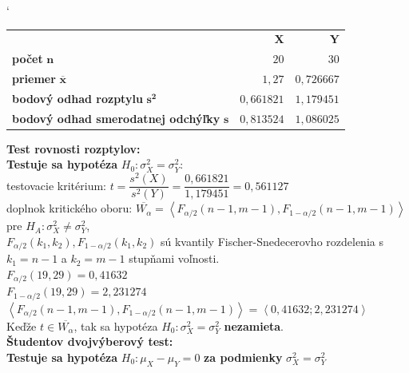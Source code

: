 \documentclass[pdftex, 11pt, a4paper, titlepage]{article}
\begin{document}
    \begin{table}[H]
        \catcode`
        \begin{tabular}{l|r|r|}
            \cline{2-3}
            & $ \boldsymbol{X} $ & $ \boldsymbol{Y} $ \\
            \cline{2-3}
			\textbf{počet} $ \boldsymbol{n} $ & $ 20 $ & $ 30 $ \\
			\textbf{priemer} $ \boldsymbol{\overline{x}} $ & $ 1,27 $
			& $ 0,726667 $ \\

			\textbf{bodový odhad rozptylu} $ \boldsymbol{s^2} $ & $ 0,661821 $
			& $ 1,179451 $ \\

			\textbf{bodový odhad smerodatnej odchýľky} $ \boldsymbol{s} $ & $ 0,813524 $
            & $ 1,086025 $ \\
            \cline{2-3}
		\end{tabular}
    \end{table}

    \newpage
    \noindent
    \textbf{Test rovnosti rozptylov:}\\
    \textbf{Testuje sa hypotéza} $H_0 : \sigma_X^2 = \sigma_Y^2$:\\

    \noindent
    testovacie kritérium: $t = \dfrac{s^2(X)}{s^2(Y)} = \dfrac{0,661821}{1,179451} = 0,561127$\\
    doplnok kritického oboru: $\overline{W_\alpha} = \left\langle F_{\alpha/2}(n-1,m-1), F_{1-\alpha/2}(n-1,m-1) \right\rangle$ pre $H_A : \sigma_X^2 \neq \sigma_Y^2$,\\
    $F_{\alpha/2}(k_1,k_2), F_{1-\alpha/2}(k_1,k_2)$ sú kvantily Fischer-Snedecerovho rozdelenia s $k_1 = n-1$ a $k_2 = m-1$ stupňami voľnosti.\\
    $F_{\alpha/2}(19,29) = 0,41632$\\
    $F_{1-\alpha/2}(19,29) = 2,231274$\\
    $\left\langle F_{\alpha/2}(n-1,m-1), F_{1-\alpha/2}(n-1,m-1) \right\rangle = \left\langle 0,41632 ; 2,231274 \right\rangle$\\
    Keďže $t \in \overline{W_\alpha}$, tak sa hypotéza $H_0 : \sigma_X^2 = \sigma_Y^2$ \textbf{nezamieta}.\\

    \noindent
    \textbf{Študentov dvojvýberový test:}\\
    \textbf{Testuje sa hypotéza} $H_0 : \mu_X - \mu_Y = 0$ \textbf{za podmienky} $\sigma_X^2 = \sigma_Y^2$\\
\end{document}
